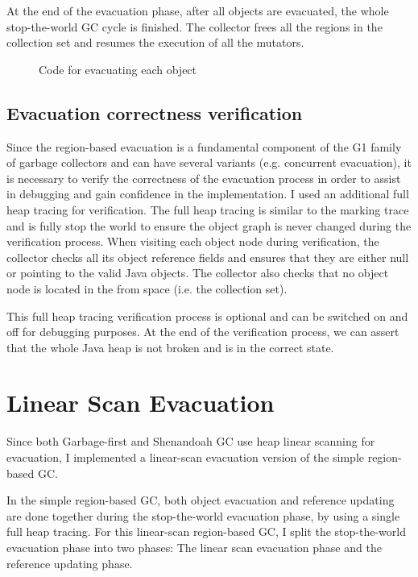 At the end of the evacuation phase, after all objects are evacuated, the whole stop-the-world GC cycle is finished.
The collector frees all the regions in the collection set and resumes the execution of all the mutators.

\begin{figure}
  \centering
  
  \caption{Code for evacuating each object}
  \label{fig:traceevacuateobject}
\end{figure}

\subsection{Evacuation correctness verification}

Since the region-based evacuation is a fundamental component of the G1 family of garbage collectors
and can have several variants (e.g. concurrent evacuation), it is necessary to verify the correctness of the evacuation process
in order to assist in debugging and gain confidence in the implementation.
I used an additional full heap tracing for verification. The full heap tracing is
similar to the marking trace and is fully stop the world to ensure the object graph is never changed
during the verification process.
When visiting each object node during verification, the collector checks all its object reference fields
and ensures that they are either null or pointing to the valid Java objects.
The collector also checks that no object node is located in the from space (i.e. the collection set).

This full heap tracing verification process is optional and can be switched on and off for
debugging purposes.
At the end of the verification process, we can assert that the whole Java heap is
not broken and is in the correct state.

\section{Linear Scan Evacuation}
\label{sec:linearscangc}

Since both Garbage-first and Shenandoah GC use heap linear scanning for evacuation,
I implemented a linear-scan evacuation version of the simple region-based GC.

In the simple region-based GC, both object evacuation and reference updating are
done together during the stop-the-world evacuation phase, by using a single full heap tracing.
For this linear-scan region-based GC, I split the stop-the-world evacuation phase into
two phases: The linear scan evacuation phase and the reference updating phase.

